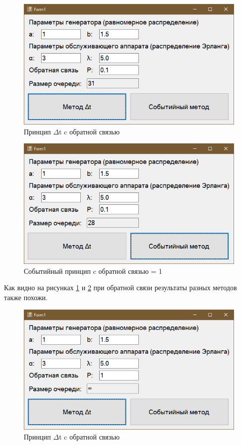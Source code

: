 \newpage
\begin{figure}[h]
\includegraphics[width=1\linewidth]{inc/img/3.png}
\caption {Принцип $\Delta$t c обратной связью}
\label{p3}
\end{figure}

\begin{figure}[!h]
	\includegraphics[width=1\linewidth]{inc/img/4.png}
	\caption{Событийный принцип c обратной связью = 1}
	\label{p4}
\end{figure}

Как видно на рисунках \ref{p3} и \ref{p4} при обратной связи результаты разных методов также похожи.

\newpage
\begin{figure}[h]
	\includegraphics[width=1\linewidth]{inc/img/5.png}
	\caption {Принцип $\Delta$t c обратной связью}
	\label{p5}
\end{figure}

